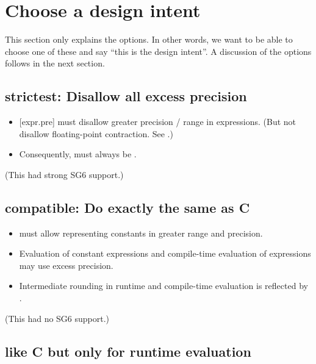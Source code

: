 \section{Choose a design intent}

This section only explains the options.
In other words, we want to be able to choose one of these and say “this is the
design intent”.
A discussion of the options follows in the next section.

\subsection{strictest: Disallow all excess precision}\label{o:1}

\begin{itemize}
  \item {[expr.pre]} must disallow greater precision / range in \fp expressions. (But not disallow floating-point contraction. See .)

  \item Consequently,  must always be .
\end{itemize}
(This had strong SG6 support.)\\

\subsection{compatible: Do exactly the same as C}\label{o:2}

\begin{itemize}
  \item {} must allow representing \fp constants in greater range and
    precision.

  \item Evaluation of constant expressions and compile-time evaluation of
    expressions may use excess precision.

  \item Intermediate rounding in runtime and compile-time evaluation is
    reflected by .
\end{itemize}
(This had no SG6 support.)\\

\pagebreak
\subsection{like C but only for runtime evaluation}\label{o:3}


